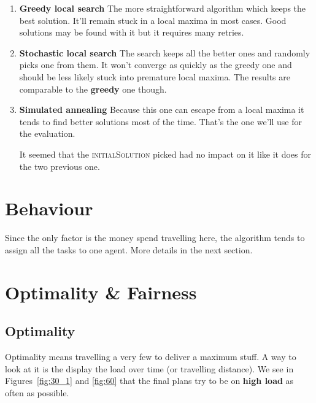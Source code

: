 \documentclass[11pt,a4paper]{article}
\begin{document}
\begin{enumerate}
    \item \textbf{Greedy local search}
        The more straightforward algorithm which keeps the best solution. It'll
        remain stuck in a local maxima in most cases. Good solutions may be
        found with it but it requires many retries.

    \item \textbf{Stochastic local search}
        The search keeps all the better ones and randomly picks one from them.
        It won't converge as quickly as the greedy one and should be less
        likely stuck into premature local maxima. The results are comparable
        to the \textbf{greedy} one though.


    \item \textbf{Simulated annealing}
        Because this one can escape from a local maxima it tends to find better
        solutions most of the time. That's the one we'll use for the evaluation.

        It seemed that the \textsc{initialSolution} picked had no impact on it
        like it does for the two previous one.

\end{enumerate}


\section*{Behaviour}

Since the only factor is the money spend travelling here, the algorithm tends
to assign all the tasks to one agent. More details in the next section.


\section*{Optimality \& Fairness}

\subsection*{Optimality}

Optimality means travelling a very few to deliver a maximum stuff. A way to
look at it is the display the load over time (or travelling distance). We see
in Figures~\ref{fig:30_1} and \ref{fig:60} that the final plans try to be on
\textbf{high load} as often as possible.
\end{document}
